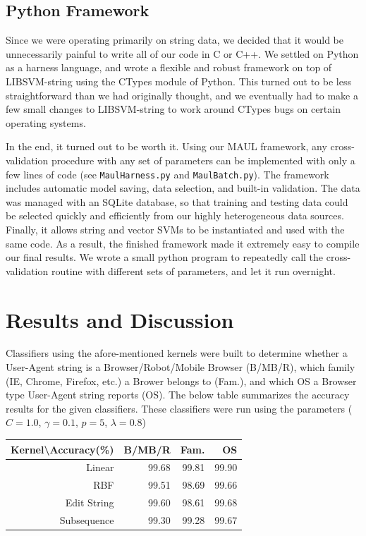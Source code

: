 \documentclass[10pt]{article}
\begin{document}
\begin{multicols}{2}
\subsection{Python Framework}

Since we were operating primarily on string data, we decided that it would be unnecessarily painful to write all of our code in C or C++. We settled on Python as a harness language, and wrote a flexible and robust framework on top of LIBSVM-string using the CTypes module of Python. This turned out to be less straightforward than we had originally thought, and we eventually had to make a few small changes to LIBSVM-string to work around CTypes bugs on certain operating systems.

In the end, it turned out to be worth it. Using our MAUL framework, any cross-validation procedure with any set of parameters can be implemented with only a few lines of code (see \texttt{MaulHarness.py} and \texttt{MaulBatch.py}). The framework includes automatic model saving, data selection, and built-in validation. The data was managed with an SQLite database, so that training and testing data could be selected quickly and efficiently from our highly heterogeneous data sources. Finally, it allows string and vector SVMs to be instantiated and used with the same code. As a result, the finished framework made it extremely easy to compile our final results. We wrote a small python program to repeatedly call the cross-validation routine with different sets of parameters, and let it run overnight.

\section{Results and Discussion}
Classifiers using the afore-mentioned kernels were built to determine whether a User-Agent string is a Browser/Robot/Mobile Browser (B/MB/R), which family (IE, Chrome, Firefox, etc.) a Brower belongs to (Fam.), and which OS a Browser type User-Agent string reports (OS).  The below table summarizes the accuracy results for the given classifiers.  These classifiers were run using the parameters ($C = 1.0$, $\gamma = 0.1$, $p = 5$, $\lambda = 0.8$)
\begin{center}
\begin{tabular} { r | r | r | r}
Kernel\textbackslash Accuracy(\%) & B/MB/R & Fam. & OS \\
\hline
Linear & 99.68 & 99.81 & 99.90 \\
RBF & 99.51 & 98.69 & 99.66 \\
Edit String & 99.60 & 98.61 & 99.68 \\
Subsequence & 99.30 & 99.28 & 99.67 \\
\end{tabular}
\end{center}


\end{multicols}
\end{document}
